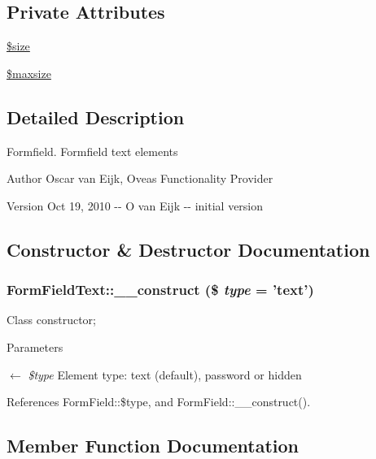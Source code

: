 \subsection*{Private Attributes}
\begin{DoxyCompactItemize}
\item 
\hyperlink{classFormFieldText_a1db9cf2b51d60717eab0d295e97bcd5b}{\$size}
\item 
\hyperlink{classFormFieldText_ac984f8586351de82eb4a461f053d5329}{\$maxsize}
\end{DoxyCompactItemize}


\subsection{Detailed Description}
Formfield. Formfield text elements \begin{DoxyAuthor}{Author}
Oscar van Eijk, Oveas Functionality Provider 
\end{DoxyAuthor}
\begin{DoxyVersion}{Version}
Oct 19, 2010 -\/-\/ O van Eijk -\/-\/ initial version 
\end{DoxyVersion}


\subsection{Constructor \& Destructor Documentation}
\subsubsection[{\_\-\_\-construct}]{\setlength{\rightskip}{0pt plus 5cm}FormFieldText::\_\-\_\-construct (\$ {\em type} = {\ttfamily 'text'})}\label{classFormFieldText_a19f605d6195d340c6ddf9a298706b9cd}
Class constructor; 
\begin{DoxyParams}{Parameters}
\item[\mbox{$\leftarrow$} {\em \$type}]Element type: text (default), password or hidden \end{DoxyParams}


References FormField::\$type, and FormField::\_\-\_\-construct().



\subsection{Member Function Documentation}
